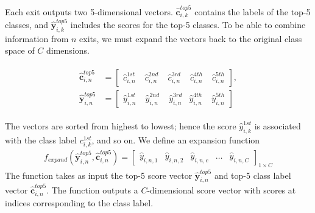 Each exit outputs two 5-dimensional vectors. $\bm{\hat{c}}_{i,k}^{top5}$ contains the labels of the top-5 classes, and $ \bm{\hat{y}}_{i,k}^{top5}$ includes the scores for the top-5 classes. To be able to combine information from $ n $ exits, we must expand the vectors back to the original class space of $ C $ dimensions.

\begin{align}
\begin{split}
\bm{\hat{c}}_{i,n}^{top5} &= \begin{bmatrix}
\hat{c}_{i,n}^{1st} & \phantom{.}\hat{c}_{i,n}^{2nd} & \phantom{.}\hat{c}_{i,n}^{3rd} & \phantom{.}\hat{c}_{i,n}^{4th} & \phantom{.}\hat{c}_{i,n}^{5th}
\end{bmatrix}, \\
\bm{\hat{y}}^{top5}_{i,n} &= \begin{bmatrix}
\hat{y}_{i,n}^{1st} & \phantom{.}\hat{y}_{i,n}^{2nd} & \phantom{.}\hat{y}_{i,n}^{3rd} & \hat{y}_{i,n}^{4th} & \phantom{.}\hat{y}_{i,n}^{5th}
\end{bmatrix}
\end{split}
\end{align}

The vectors are sorted from highest to lowest; hence the score $ \hat{y}_{i,k}^{1st} $ is associated with the class label $ c_{i,k}^{1st} $, and so on. 
We define an expansion function 
\begin{align}
f_{expand}\left(\bm{\hat{y}}_{i,n}^{top5},\bm{\hat{c}}_{i,n}^{top5}\right) = 
\begin{bmatrix}
\hat{y}_{i,n,1} & \hat{y}_{i,n,2} & \hat{y}_{i,n,c} & \dots & \hat{y}_{i,n,C}
\end{bmatrix}_{1 \times C}
\end{align}
The function takes as input the top-5 score vector $ \bm{\hat{y}}_{i,n}^{top5}$ and top-5 class label vector  $\bm{\hat{c}}_{i,n}^{top5}$. The function outputs a $ C $-dimensional score vector with scores at indices corresponding to the class label. 

